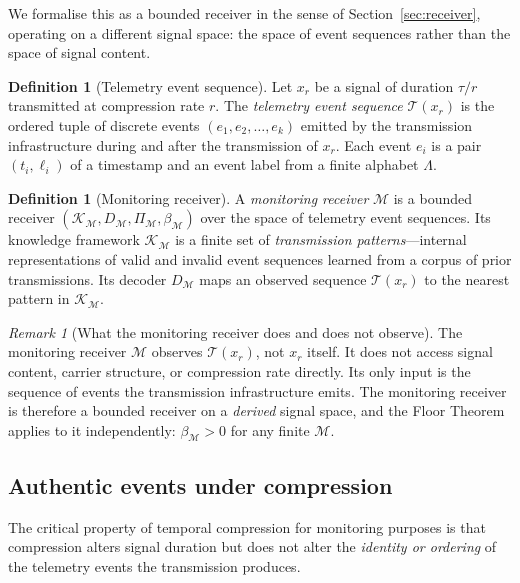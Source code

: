 \documentclass[twocolumn,11pt,a4paper]{article}
\theoremstyle{main}
\theoremstyle{definition}
\newtheorem{definition}[theorem]{Definition}
\theoremstyle{remark}
\newtheorem{remark}[theorem]{Remark}
\newcommand{\Know}{\mathcal{K}}
\newcommand{\Dec}{D}
\newcommand{\Proj}{\Pi}
\newcommand{\floor}{\beta}
\newcommand{\rate}{r}
\newcommand{\Mon}{\mathcal{M}}        %
\newcommand{\Tel}{\mathcal{T}}        %
\begin{document}
We formalise this as a bounded receiver in the sense of
Section~\ref{sec:receiver}, operating on a different signal space: the
space of event sequences rather than the space of signal content.

\begin{definition}[Telemetry event sequence]
\label{def:telemetry}
Let $x_\rate$ be a signal of duration $\tau/\rate$ transmitted at
compression rate $\rate$. The \emph{telemetry event sequence}
$\Tel(x_\rate)$ is the ordered tuple of discrete events
$(e_1, e_2, \ldots, e_k)$ emitted by the transmission infrastructure
during and after the transmission of $x_\rate$. Each event $e_i$ is a
pair $(t_i, \ell_i)$ of a timestamp and an event label from a finite
alphabet $\Lambda$.
\end{definition}

\begin{definition}[Monitoring receiver]
\label{def:monitor}
A \emph{monitoring receiver} $\Mon$ is a bounded receiver
$(\Know_\Mon, \Dec_\Mon, \Proj_\Mon, \floor_\Mon)$ over the space of
telemetry event sequences. Its knowledge framework $\Know_\Mon$ is a
finite set of \emph{transmission patterns}---internal representations
of valid and invalid event sequences learned from a corpus of prior
transmissions. Its decoder $\Dec_\Mon$ maps an observed sequence
$\Tel(x_\rate)$ to the nearest pattern in $\Know_\Mon$.
\end{definition}

\begin{remark}[What the monitoring receiver does and does not observe]
The monitoring receiver $\Mon$ observes $\Tel(x_\rate)$, not $x_\rate$
itself. It does not access signal content, carrier structure, or
compression rate directly. Its only input is the sequence of events the
transmission infrastructure emits. The monitoring receiver is therefore
a bounded receiver on a \emph{derived} signal space, and the
Floor Theorem applies to it independently: $\floor_\Mon > 0$ for any
finite $\Mon$.
\end{remark}

\subsection{Authentic events under compression}

The critical property of temporal compression for monitoring purposes
is that compression alters signal duration but does not alter the
\emph{identity or ordering} of the telemetry events the transmission
produces.
\end{document}
